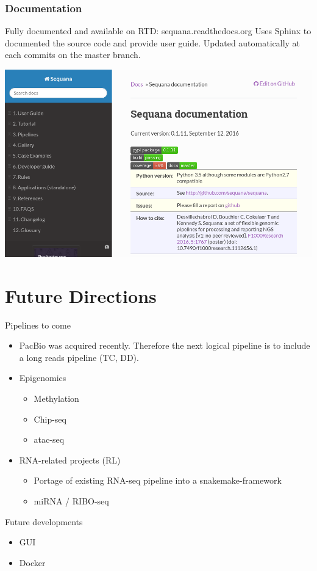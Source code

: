 \documentclass{beamer}
\begin{document}
\begin{frame}[fragile]
    \frametitle{Documentation}
    Fully documented and available on RTD: sequana.readthedocs.org
    Uses Sphinx to documented the source code and provide user guide.
    Updated automatically at each commits on the master branch.
\begin{center}
\includegraphics[scale=0.3]{images/rtd}
\end{center}
    
\end{frame}


\section{Future Directions}

\begin{frame}
\begin{block}{Pipelines to come}
\begin{itemize}
 \item PacBio was acquired recently. Therefore the next logical pipeline is to include
 a long reads pipeline (TC, DD). 
 \item Epigenomics
     \begin{itemize}
     \item Methylation
      \item Chip-seq 
      \item atac-seq 
     \end{itemize}
 \item RNA-related projects (RL)
     \begin{itemize}
     \item Portage of existing RNA-seq pipeline into a snakemake-framework
     \item miRNA / RIBO-seq   
     \end{itemize}
\end{itemize}
\end{block}

\begin{block}{Future developments}
 \begin{itemize}
  \item GUI 
  \item Docker
 \end{itemize}
\end{block}
 \end{frame}
\end{document}
